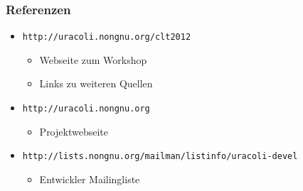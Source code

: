 \documentclass{beamer}
\begin{document}
\begin{frame}
\frametitle{Referenzen}

\begin{itemize}
\item \texttt{http://uracoli.nongnu.org/clt2012}
	\begin{itemize}
	\item Webseite zum Workshop
	\item Links zu weiteren Quellen
	\end{itemize}

\item \texttt{http://uracoli.nongnu.org}
	\begin{itemize}
	\item Projektwebseite
	\end{itemize}

\item {\small\texttt{http://lists.nongnu.org/mailman/listinfo/uracoli-devel}}%
	\begin{itemize}
	\item Entwickler Mailingliste
	\end{itemize}
\end{itemize}

\end{frame}


\begin{frame}
\tableofcontents
\end{frame}
\end{document}
